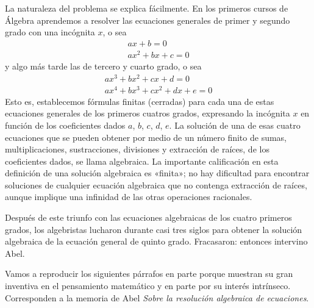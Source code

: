 \documentclass[a4paper, 12pt, draft]{article}
\begin{document}
La naturaleza del problema se explica fácilmente. En los primeros cursos de Álgebra aprendemos a resolver las ecuaciones generales de primer y segundo grado con una incógnita $x$, o sea
\begin{equation*}
\begin{split}
ax+b=0\\
ax^2+bx+c=0
\end{split}
\end{equation*}
y algo más tarde las de tercero y cuarto grado, o sea
\begin{equation*}
\begin{split}
ax^3+bx^2+cx+d=0 \\
ax^4+bx^3+cx^2+dx+e=0
\end{split}
\end{equation*}
Esto es, establecemos fórmulas finitas (cerradas) para cada una de estas ecuaciones generales de los primeros cuatros grados, expresando la incógnita $x$ en función de los coeficientes dados $a$, $b$, $c$, $d$, $e$. La solución de una de esas cuatro ecuaciones que se pueden obtener por medio de un número finito de sumas, multiplicaciones, sustracciones, divisiones y extracción de raíces, de los coeficientes dados, se llama algebraica. La importante calificación en esta definición de una solución algebraica es «finita»; no hay dificultad para encontrar soluciones de cualquier ecuación algebraica que no contenga extracción de raíces, aunque implique una infinidad de las otras operaciones racionales.

Después de este triunfo con las ecuaciones algebraicas de los cuatro primeros grados, los algebristas lucharon durante casi tres siglos para obtener la solución algebraica de la ecuación general de quinto grado. Fracasaron: entonces intervino Abel.

Vamos a reproducir los siguientes párrafos en parte porque muestran su gran inventiva en el pensamiento matemático y en parte por su interés intrínseco. Corresponden a la memoria de Abel {\it Sobre la resolución algebraica de ecuaciones}.
\end{document}
